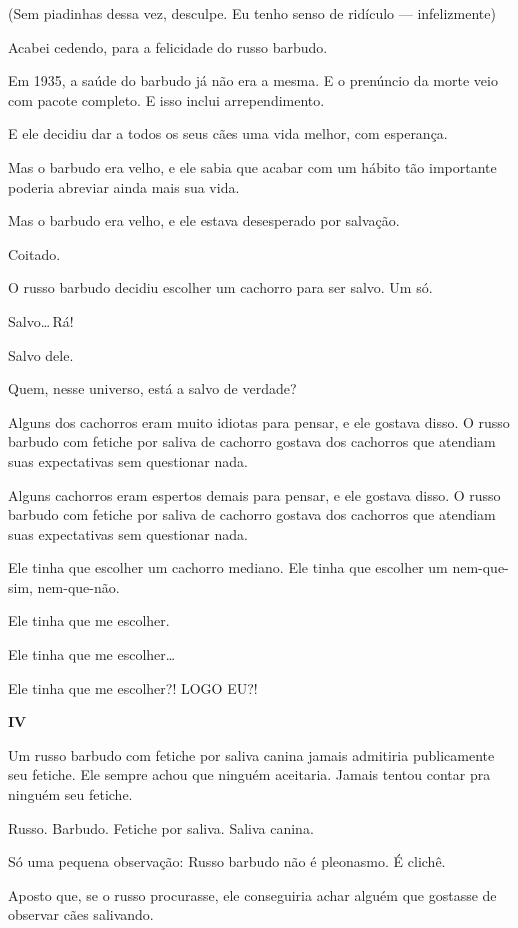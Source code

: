 (Sem piadinhas dessa vez, desculpe. Eu tenho senso de ridículo --- infelizmente)

Acabei cedendo, para a felicidade do russo barbudo.

Em 1935, a saúde do barbudo já não era a mesma. E o prenúncio da morte veio com pacote completo. E isso inclui arrependimento.

E ele decidiu dar a todos os seus cães uma vida melhor, com esperança.

Mas o barbudo era velho, e ele sabia que acabar com um hábito tão importante poderia abreviar ainda mais sua vida.

Mas o barbudo era velho, e ele estava desesperado por salvação.

Coitado.

O russo barbudo decidiu escolher um cachorro para ser salvo. Um só.

Salvo\ldots\,Rá!

Salvo dele.

Quem, nesse universo, está a salvo de verdade?

Alguns dos cachorros eram muito idiotas para pensar, e ele gostava disso. O russo barbudo com fetiche por saliva de cachorro gostava dos cachorros que atendiam suas expectativas sem questionar nada.

Alguns cachorros eram espertos demais para pensar, e ele gostava disso. O russo barbudo com fetiche por saliva de cachorro gostava dos cachorros que atendiam suas expectativas sem questionar nada.

Ele tinha que escolher um cachorro mediano. Ele tinha que escolher um nem-que-sim, nem-que-não.

Ele tinha que me escolher.

Ele tinha que me escolher\ldots

Ele tinha que me escolher?! LOGO EU?!

\newpage
\begin{center}
{\Large \textbf{IV}}
\end{center}

Um russo barbudo com fetiche por saliva canina jamais admitiria publicamente seu fetiche. Ele sempre achou que ninguém aceitaria. Jamais tentou contar pra ninguém seu fetiche.

Russo. Barbudo. Fetiche por saliva. Saliva canina.

Só uma pequena observação: Russo barbudo não é pleonasmo. É clichê.

Aposto que, se o russo procurasse, ele conseguiria achar alguém que gostasse de observar cães salivando.

